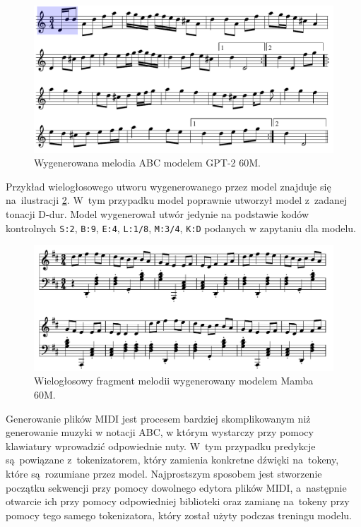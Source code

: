\documentclass[data-science]{agh-wi} %
\begin{document}
\begin{figure}[ht!]
    \begin{center}
        \includegraphics[width=0.9\linewidth]{./img/abc_gen_nice1.pdf}
    \end{center}
    \caption{Wygenerowana melodia ABC modelem GPT-2 60M.}\label{fig:music_gen1}
\end{figure}

Przykład wielogłosowego utworu wygenerowanego przez model znajduje się na~ilustracji \ref*{fig:vvv_abc}. W~tym przypadku model poprawnie utworzył model z~zadanej tonacji D-dur. Model wygenerował utwór jedynie na podstawie kodów kontrolnych \texttt{S:2}, \texttt{B:9}, \texttt{E:4}, \texttt{L:1/8}, \texttt{M:3/4}, \texttt{K:D} podanych w zapytaniu dla modelu.

\begin{figure}[ht!]
    \centering
    \includegraphics[width=0.9\linewidth]{./img/example.pdf}
    \caption{Wielogłosowy fragment melodii wygenerowany modelem Mamba 60M.}\label{fig:vvv_abc}
\end{figure}

Generowanie plików MIDI jest procesem bardziej skomplikowanym niż generowanie muzyki w notacji ABC, w którym wystarczy przy pomocy klawiatury wprowadzić odpowiednie nuty. W~tym przypadku predykcje są~powiązane z~tokenizatorem, który zamienia konkretne dźwięki na~tokeny, które są~rozumiane przez model. Najprostszym sposobem jest stworzenie początku sekwencji przy pomocy dowolnego edytora plików MIDI, a~następnie otwarcie ich przy pomocy odpowiedniej biblioteki oraz zamianę na~tokeny przy pomocy tego samego tokenizatora, który został użyty podczas treningu modelu.
\end{document}
